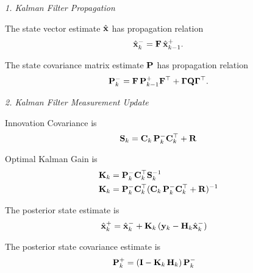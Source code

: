 \noindent
\textit{1. Kalman Filter Propagation}

The state vector estimate $\hat{\mathbf{x}}$ has propagation relation
\begin{equation}
	\hat{\mathbf{x}}_{k}^- = \mathbf{F} \, \hat{\mathbf{x}}_{k-1}^+.
\end{equation}

The state covariance matrix estimate $\mathbf{P}$ has propagation relation
\begin{equation}
	\mathbf{P}_{k}^- = \mathbf{F} \, \mathbf{P}_{k-1}^+ \mathbf{F}^\top + \boldsymbol{\Gamma} \mathbf{Q} \boldsymbol{\Gamma}^\top.
\end{equation}

\noindent
\textit{2. Kalman Filter Measurement Update}

Innovation Covariance is 
\begin{equation}
	\mathbf{S}_k = \mathbf{C}_k \, \mathbf{P}^-_k \mathbf{C}_k^\top + \mathbf{R}
\end{equation}

Optimal Kalman Gain is
\begin{align}
	\mathbf{K}_k &= \mathbf{P}_k^- \mathbf{C}_k^\top \mathbf{S}_k^{-1} \nonumber \\
	\mathbf{K}_k &= \mathbf{P}_k^- \mathbf{C}_k^\top (\mathbf{C}_k \, \mathbf{P}_k^- \mathbf{C}_k^\top + \mathbf{R})^{-1}
\end{align}

The posterior state estimate is
\begin{align}
	\hat{\mathbf{x}}_k^+ &= \hat{\mathbf{x}}_k^- + \mathbf{K}_k \, (\mathbf{y}_k - \mathbf{H}_k \hat{\mathbf{x}}_k^-)
\end{align}

The posterior state covariance estimate is
\begin{align}
	\mathbf{P}_k^+ &= (\mathbf{I} - \mathbf{K}_k \, \mathbf{H}_k) \, \mathbf{P}_k^-
\end{align}